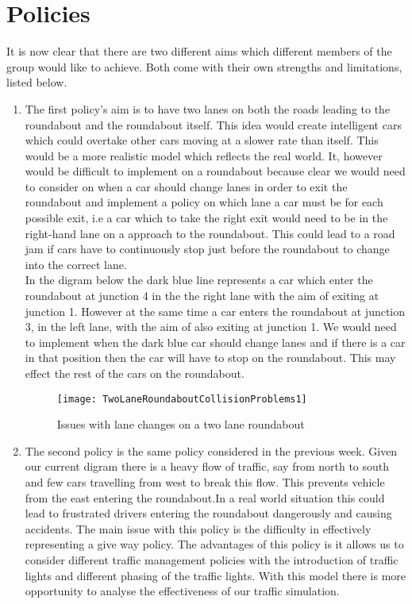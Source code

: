 \documentclass{article}
\begin{document}
	\section*{Policies}
	It is now clear that there are two different aims which different members of the group would like to achieve. Both come with their own strengths and limitations, listed below. \\
	\begin{enumerate}
		\item The first policy's aim is to have two lanes on both the roads leading to the roundabout and the roundabout itself. This idea would create intelligent cars which could overtake other cars moving at a slower rate than itself. This would be a more realistic model which reflects the real world. It, however would be difficult to implement on a roundabout because clear we would need to  consider on when a car should change lanes in order to exit the roundabout and implement a policy on which lane a car must be for each possible exit, i.e a car which to take the right exit would need to be in the right-hand lane on a approach to the roundabout. This could lead to a road jam if cars have to continuously stop just before the roundabout to change into the correct lane.\\
		In the digram below the dark blue line represents a car which enter the roundabout at junction 4 in the the right lane with the aim of exiting at junction 1. However at the same time a car enters the roundabout at junction 3, in the left lane,  with the aim of also exiting at junction 1. We would need to implement when the dark blue car should change lanes and if there is a car in that position then the car will have to stop on the roundabout. This may effect the rest of the cars on the roundabout. 
		
			\begin{figure}[h]
				\caption{Issues with lane changes on a two lane roundabout}
				\texttt{[image: TwoLaneRoundaboutCollisionProblems1]}
				\centering
			\end{figure}
			
		\item The second policy is the same policy considered in the previous week. Given our current digram there is a heavy flow of traffic, say from north to south and  few cars travelling from west to break this flow. This prevents vehicle from the east entering the roundabout.In a real world situation this could lead to frustrated drivers entering the roundabout dangerously and causing accidents. The main issue with this policy is the difficulty in effectively representing a give way policy. The advantages of this policy is it allows us to consider different traffic management policies with the introduction of traffic lights and different phasing of the traffic lights. With this model there is more opportunity to analyse the effectiveness of our traffic simulation. 
		

\end{enumerate}
\end{document}
